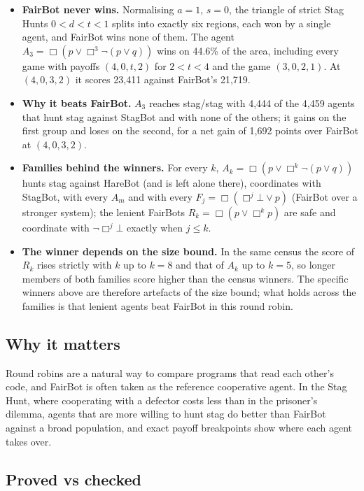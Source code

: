 \documentclass{article}
\begin{document}
\begin{itemize}
\item \textbf{FairBot never wins.} Normalising $a = 1$, $s = 0$, the triangle of strict Stag Hunts $0 < d < t < 1$ splits into exactly six regions, each won by a single agent, and FairBot wins none of them. The agent $A_3 = \Box(p \vee \Box^3\neg(p \vee q))$ wins on 44.6\% of the area, including every game with payoffs $(4, 0, t, 2)$ for $2 < t < 4$ and the game $(3, 0, 2, 1)$. At $(4, 0, 3, 2)$ it scores 23,411 against FairBot's 21,719.
\item \textbf{Why it beats FairBot.} $A_3$ reaches stag/stag with 4,444 of the 4,459 agents that hunt stag against StagBot and with none of the others; it gains on the first group and loses on the second, for a net gain of 1,692 points over FairBot at $(4, 0, 3, 2)$.
\item \textbf{Families behind the winners.} For every $k$, $A_k = \Box(p \vee \Box^k\neg(p \vee q))$ hunts stag against HareBot (and is left alone there), coordinates with StagBot, with every $A_m$ and with every $F_j = \Box(\Box^j\bot \vee p)$ (FairBot over a stronger system); the lenient FairBots $R_k = \Box(p \vee \Box^k p)$ are safe and coordinate with $\neg\Box^j\bot$ exactly when $j \le k$.
\item \textbf{The winner depends on the size bound.} In the same census the score of $R_k$ rises strictly with $k$ up to $k = 8$ and that of $A_k$ up to $k = 5$, so longer members of both families score higher than the census winners. The specific winners above are therefore artefacts of the size bound; what holds across the families is that lenient agents beat FairBot in this round robin.
\end{itemize}

\subsection*{Why it matters}

Round robins are a natural way to compare programs that read each other's code, and FairBot is
often taken as the reference cooperative agent. In the Stag Hunt, where cooperating with a
defector costs less than in the prisoner's dilemma, agents that are more willing to hunt stag do
better than FairBot against a broad population, and exact payoff breakpoints show where each
agent takes over.

\subsection*{Proved vs checked}
\end{document}
